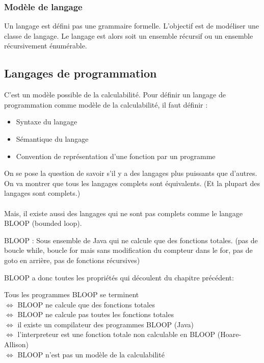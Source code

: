 \subsubsection{Modèle de langage}
\label{ssub:mod_le_de_langage}
Un langage est défini pas une grammaire formelle. L'objectif est de modéliser 
une classe de langage. Le langage est alors soit un ensemble récursif ou un 
ensemble récursivement énumérable.


\subsection{Langages de programmation}
\label{sub:langages_de_programmation}
C'est un modèle possible de la calculabilité. Pour définir un langage de 
programmation comme modèle de la calculabilité, il faut définir : 
\begin{itemize}
	\item Syntaxe du langage
	\item Sémantique du langage
	\item Convention de représentation d'une fonction par un programme
\end{itemize}

On se pose la question de savoir s'il y a des langages plus puissants que 
d'autres. On va montrer que tous les langages complets sont équivalents. (Et la 
plupart des langages sont complets.)

\paragraph{} Mais, il existe aussi des langages qui ne sont pas complets comme le 
langage BLOOP (bounded loop).

\begin{mydef}
	BLOOP : Sous ensemble de Java qui ne calcule que des fonctions totales. 
	(pas de boucle while, boucle for mais sans modification du compteur 
	dans le for, pas de goto en arrière, pas de fonctions récursives)
\end{mydef}

BLOOP a donc toutes les propriétés qui découlent du chapitre précédent:

\begin{myprop}
	Tous les programmes BLOOP se terminent\\
	$ \Leftrightarrow$ BLOOP ne calcule que des fonctions totales\\
	$ \Leftrightarrow$ BLOOP ne calcule pas toutes les fonctions totales\\
	$ \Leftrightarrow$ il existe un compilateur des programmes BLOOP (Java)\\
	$ \Leftrightarrow$ l'interpreteur est une fonction totale non calculable en
BLOOP (Hoare-Allison)\\
	$ \Leftrightarrow$ BLOOP n'est pas un modèle de la calculabilité\\
\end{myprop}

